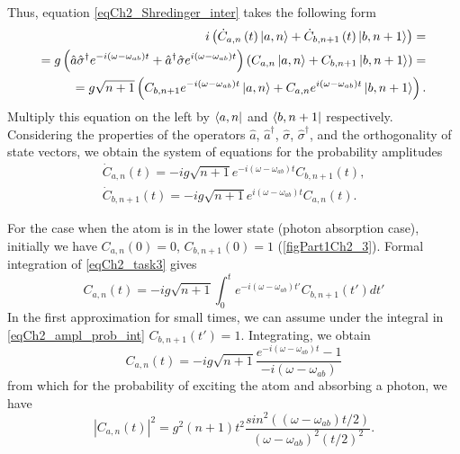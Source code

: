 Thus, equation \eqref{eqCh2_Shredinger_inter} takes the following form   
\begin{eqnarray}
i \left( 
{\dot C}_{a,n}\left(t\right)\ket{a, n} +
{\dot C}_{b,n+1}\left(t\right)\ket{b, n + 1}
\right) =
\nonumber \\
= g \left(
\hat{a}\hat{\sigma}^{\dag} e^{-i \left(\omega - \omega_{ab}\right)t} +
\hat{a}^{\dag}\hat{\sigma} e^{i \left(\omega - \omega_{ab}\right)t}
\right) 
\left( 
C_{a,n}\ket{a, n} +
C_{b,n+1}\ket{b, n + 1}
\right) = 
\nonumber \\
= g \sqrt{n + 1} \left(
C_{b, n+1} e^{-i \left(\omega - \omega_{ab}\right)t} \ket{a, n} + 
C_{a, n} e^{i \left(\omega - \omega_{ab}\right)t} \ket{b, n + 1}
\right).
\end{eqnarray}
Multiply this equation on the left by 
$\bra{a, n}$ and $\bra{b, n + 1}$ respectively. Considering the properties of the operators $\hat{a}$, $\hat{a}^{\dag}$, $\hat{\sigma}$, $\hat{\sigma}^{\dag}$, and the orthogonality of state vectors, we obtain  
the system of equations for the probability amplitudes 
\begin{eqnarray}
{\dot C}_{a,n}\left(t\right) = -i g \sqrt{n + 1}
e^{-i \left(\omega - \omega_{ab}\right)t} 
C_{b, n + 1}\left(t\right),
\nonumber \\
{\dot C}_{b, n + 1}\left(t\right) = -i g \sqrt{n + 1}
e^{i \left(\omega - \omega_{ab}\right)t} 
C_{a, n}\left(t\right).
\label{eqCh2_task3}
\end{eqnarray}



For the case when the atom is in the lower state (photon absorption case), initially we have  
$C_{a, n}\left(0\right) = 0$, $C_{b, n + 1}\left(0\right) = 1$
(\autoref{figPart1Ch2_3}). Formal integration of \eqref{eqCh2_task3} gives  
\begin{equation}
C_{a,n}\left(t\right) = -i g \sqrt{n + 1}
\int_0^t e^{-i \left(\omega - \omega_{ab}\right)t'} 
C_{b, n + 1}\left(t'\right) dt'
\label{eqCh2_ampl_prob_int}
\end{equation}
In the first approximation for small times, we can assume under the integral in
\eqref{eqCh2_ampl_prob_int} 
$C_{b, n + 1}\left(t'\right) = 1$. Integrating, we obtain  
\begin{equation}
C_{a,n}\left(t\right) = -i g \sqrt{n + 1}
\frac{e^{-i \left(\omega - \omega_{ab}\right)t} - 1}
{-i \left(\omega - \omega_{ab}\right)}
\end{equation}
from which for the probability of exciting the atom and absorbing a photon, we have
\begin{equation}
\left|C_{a,n}\left(t\right)\right|^2 = g^2 \left(n + 1\right) t^2
\frac{sin^2\left(\left(\omega - \omega_{ab}\right)t/2\right)}
{\left(\omega - \omega_{ab}\right)^2\left(t/2\right)^2}. 
\label{eqCh2_prob_C_an}
\end{equation}


